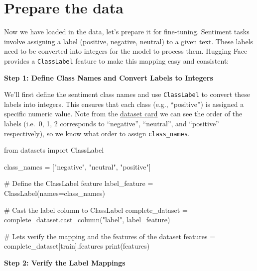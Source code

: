 \documentclass[
  letterpaper,
  DIV=11,
  numbers=noendperiod]{scrreprt}
\newenvironment{Shaded}{\begin{snugshade}}{\end{snugshade}}
\newcommand{\BuiltInTok}[1]{\textcolor[rgb]{0.00,0.23,0.31}{#1}}
\newcommand{\CommentTok}[1]{\textcolor[rgb]{0.37,0.37,0.37}{#1}}
\newcommand{\ImportTok}[1]{\textcolor[rgb]{0.00,0.46,0.62}{#1}}
\newcommand{\NormalTok}[1]{\textcolor[rgb]{0.00,0.23,0.31}{#1}}
\newcommand{\OperatorTok}[1]{\textcolor[rgb]{0.37,0.37,0.37}{#1}}
\newcommand{\StringTok}[1]{\textcolor[rgb]{0.13,0.47,0.30}{#1}}
\begin{document}
\section{Prepare the data}\label{prepare-the-data-2}

Now we have loaded in the data, let's prepare it for fine-tuning.
Sentiment tasks involve assigning a label (positive, negative, neutral)
to a given text. These labels need to be converted into integers for the
model to process them. Hugging Face provides a \texttt{ClassLabel}
feature to make this mapping easy and consistent:

\textbf{Step 1: Define Class Names and Convert Labels to Integers}

We'll first define the sentiment class names and use \texttt{ClassLabel}
to convert these labels into integers. This ensures that each class
(e.g., ``positive'') is assigned a specific numeric value. Note from the
\href{https://huggingface.co/datasets/cardiffnlp/tweet_eval/viewer/sentiment}{dataset
card} we can see the order of the labels (i.e.~0, 1, 2 corresponds to
``negative'', ``neutral'', and ``positive'' respectively), so we know
what order to assign \texttt{class\_names}.

\begin{Shaded}
\begin{Highlighting}[]
\ImportTok{from}\NormalTok{ datasets }\ImportTok{import}\NormalTok{ ClassLabel}

\NormalTok{class\_names }\OperatorTok{=}\NormalTok{ [}\StringTok{"negative"}\NormalTok{, }\StringTok{"neutral"}\NormalTok{, }\StringTok{"positive"}\NormalTok{]}

\CommentTok{\# Define the ClassLabel feature}
\NormalTok{label\_feature }\OperatorTok{=}\NormalTok{ ClassLabel(names}\OperatorTok{=}\NormalTok{class\_names)}

\CommentTok{\# Cast the \textquotesingle{}label\textquotesingle{} column to ClassLabel}
\NormalTok{complete\_dataset }\OperatorTok{=}\NormalTok{ complete\_dataset.cast\_column(}\StringTok{"label"}\NormalTok{, label\_feature)}

\CommentTok{\# Let\textquotesingle{}s verify the mapping and the features of the dataset}
\NormalTok{features }\OperatorTok{=}\NormalTok{ complete\_dataset[}\StringTok{\textquotesingle{}train\textquotesingle{}}\NormalTok{].features}
\BuiltInTok{print}\NormalTok{(features)}
\end{Highlighting}
\end{Shaded}

\textbf{Step 2: Verify the Label Mappings}
\end{document}
